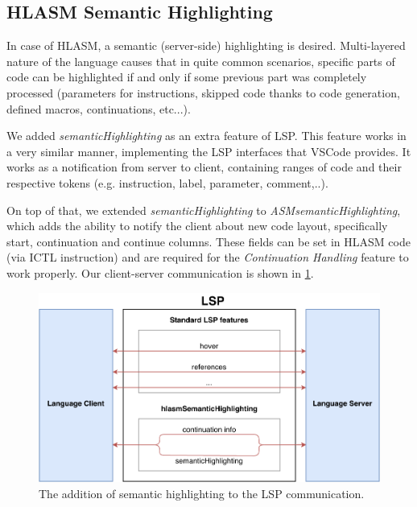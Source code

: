 \subsection{HLASM Semantic Highlighting}

In case of HLASM, a semantic (server-side) highlighting is desired. Multi-layered nature of the language causes that in quite common scenarios, specific parts of code can be highlighted if and only if some previous part was completely processed (parameters for instructions, skipped code thanks to code generation, defined macros, continuations, etc...).

We added \emph{semanticHighlighting} as an extra feature of LSP. This feature works in a very similar manner, implementing the LSP interfaces that VSCode provides. It works as a notification from server to client, containing ranges of code and their respective tokens (e.g. instruction, label, parameter, comment,..). 

On top of that, we extended \emph{semanticHighlighting} to \emph{ASMsemanticHighlighting}, which adds the ability to notify the client about new code layout, specifically start, continuation and continue columns. These fields can be set in HLASM code (via ICTL instruction) and are required for the \emph{Continuation Handling} feature to work properly. Our client-server communication is shown in \cref{fig08:lsp}.


\begin{figure}
	\centering
	\includegraphics[width=\textwidth]{img/lsp_addition}
	\caption{The addition of semantic highlighting to the LSP communication.}
	
	\label{fig08:lsp}
\end{figure}

